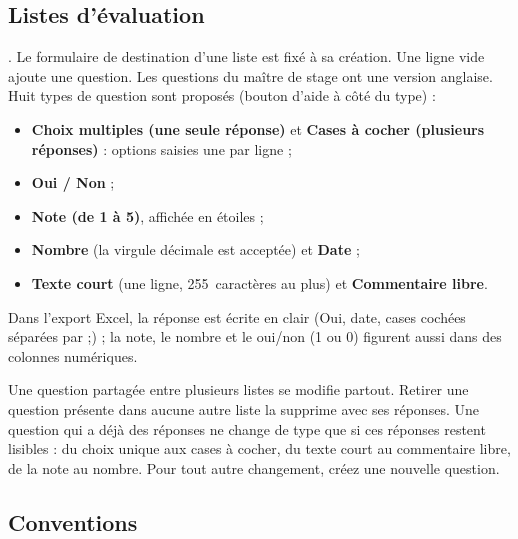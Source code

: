 \documentclass[11pt,a4paper]{article}
\begin{document}
\subsection{Listes d'évaluation}

. Le formulaire de destination
d'une liste est fixé à sa création. Une ligne vide ajoute une question. Les
questions du maître de stage ont une version anglaise. Huit types de question
sont proposés (bouton d'aide à côté du type) :

\begin{itemize}
  \item \textbf{Choix multiples (une seule réponse)} et \textbf{Cases à cocher
        (plusieurs réponses)} : options saisies une par ligne ;
  \item \textbf{Oui / Non} ;
  \item \textbf{Note (de 1 à 5)}, affichée en étoiles ;
  \item \textbf{Nombre} (la virgule décimale est acceptée) et \textbf{Date} ;
  \item \textbf{Texte court} (une ligne, 255~caractères au plus) et
        \textbf{Commentaire libre}.
\end{itemize}

Dans l'export Excel, la réponse est écrite en clair (\og Oui\fg{}, date, cases
cochées séparées par \og ;\fg{}) ; la note, le nombre et le oui/non (1 ou 0)
figurent aussi dans des colonnes numériques.


\begin{attention}
Une question partagée entre plusieurs listes se modifie partout. Retirer une
question présente dans aucune autre liste la supprime avec ses réponses. Une
question qui a déjà des réponses ne change de type que si ces réponses restent
lisibles : du choix unique aux cases à cocher, du texte court au commentaire
libre, de la note au nombre. Pour tout autre changement, créez une nouvelle
question.
\end{attention}

\subsection{Conventions}
\label{sec:conventions}
\end{document}
